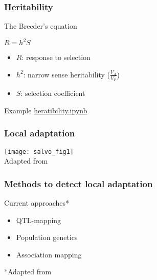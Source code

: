 \begin{frame}
\frametitle{Heritability}
\begin{block}{The Breeder's equation}
\begin{center}
\huge
$R = h^2S$
\end{center}
\begin{itemize}
\item[]{$R$: response to selection}
\item[]{$h^2$: narrow sense heritability ($\frac{V_A}{V_P}$)}
\item[]{$S$: selection coefficient}
\end{itemize}
\end{block}

\begin{block}{Example}
\href{http://localhost:8888/notebooks/heritability.ipynb}{heratibility.ipynb}
\end{block}
\end{frame}



\begin{frame}
\frametitle{Local adaptation}
\begin{block}{}
\centering
\texttt{[image: salvo\_fig1]}\\
\tiny
Adapted from \citet[Figure 1]{Savolainen:2013dfa}
\end{block}
\end{frame}

\begin{frame}
\frametitle{Methods to detect local adaptation}
\begin{block}{Current approaches*}{}
\begin{itemize}
\item{QTL-mapping}
\item{Population genetics}
\item{Association mapping}
\end{itemize}
\end{block}
\tiny
*Adapted from \citet{Savolainen:2013dfa}
\end{frame}

